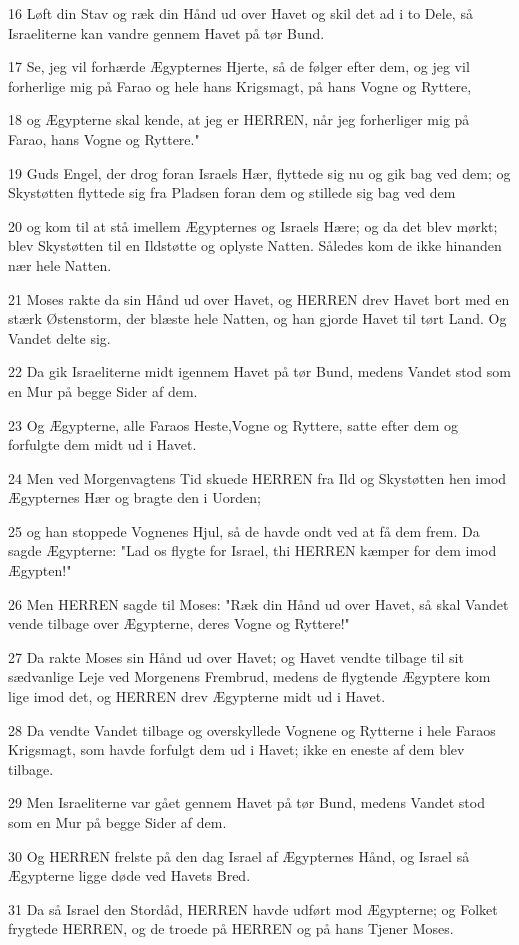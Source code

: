 \par 16 Løft din Stav og ræk din Hånd ud over Havet og skil det ad i to Dele, så Israeliterne kan vandre gennem Havet på tør Bund.
\par 17 Se, jeg vil forhærde Ægypternes Hjerte, så de følger efter dem, og jeg vil forherlige mig på Farao og hele hans Krigsmagt, på hans Vogne og Ryttere,
\par 18 og Ægypterne skal kende, at jeg er HERREN, når jeg forherliger mig på Farao, hans Vogne og Ryttere."
\par 19 Guds Engel, der drog foran Israels Hær, flyttede sig nu og gik bag ved dem; og Skystøtten flyttede sig fra Pladsen foran dem og stillede sig bag ved dem
\par 20 og kom til at stå imellem Ægypternes og Israels Hære; og da det blev mørkt; blev Skystøtten til en Ildstøtte og oplyste Natten. Således kom de ikke hinanden nær hele Natten.
\par 21 Moses rakte da sin Hånd ud over Havet, og HERREN drev Havet bort med en stærk Østenstorm, der blæste hele Natten, og han gjorde Havet til tørt Land. Og Vandet delte sig.
\par 22 Da gik Israeliterne midt igennem Havet på tør Bund, medens Vandet stod som en Mur på begge Sider af dem.
\par 23 Og Ægypterne, alle Faraos Heste,Vogne og Ryttere, satte efter dem og forfulgte dem midt ud i Havet.
\par 24 Men ved Morgenvagtens Tid skuede HERREN fra Ild og Skystøtten hen imod Ægypternes Hær og bragte den i Uorden;
\par 25 og han stoppede Vognenes Hjul, så de havde ondt ved at få dem frem. Da sagde Ægypterne: "Lad os flygte for Israel, thi HERREN kæmper for dem imod Ægypten!"
\par 26 Men HERREN sagde til Moses: "Ræk din Hånd ud over Havet, så skal Vandet vende tilbage over Ægypterne, deres Vogne og Ryttere!"
\par 27 Da rakte Moses sin Hånd ud over Havet; og Havet vendte tilbage til sit sædvanlige Leje ved Morgenens Frembrud, medens de flygtende Ægyptere kom lige imod det, og HERREN drev Ægypterne midt ud i Havet.
\par 28 Da vendte Vandet tilbage og overskyllede Vognene og Rytterne i hele Faraos Krigsmagt, som havde forfulgt dem ud i Havet; ikke en eneste af dem blev tilbage.
\par 29 Men Israeliterne var gået gennem Havet på tør Bund, medens Vandet stod som en Mur på begge Sider af dem.
\par 30 Og HERREN frelste på den dag Israel af Ægypternes Hånd, og Israel så Ægypterne ligge døde ved Havets Bred.
\par 31 Da så Israel den Stordåd, HERREN havde udført mod Ægypterne; og Folket frygtede HERREN, og de troede på HERREN og på hans Tjener Moses.

